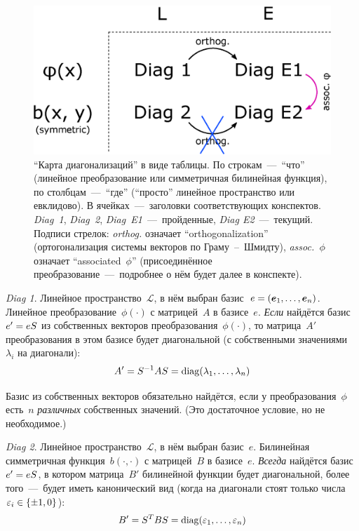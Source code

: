\documentclass[a4paper,12pt]{article}
\theoremstyle{remark}
\begin{document}
  \begin{figure}[h]
    \centering
    
    \includegraphics[width=0.7\columnwidth]{diag-scheme}
    
    \caption{``Карта диагонализаций'' в виде таблицы. По строкам~---~``что'' (линейное преобразование или симметричная билинейная функция), по столбцам~---~``где'' (``просто'' линейное пространство или евклидово). В ячейках~---~заголовки соответствующих конспектов. \emph{Diag~1}, \emph{Diag~2}, \emph{Diag~E1}~---~пройденные, \emph{Diag E2}~---~текущий. Подписи стрелок: \emph{orthog.} означает ``orthogonalization'' (ортогонализация системы векторов по Граму~--~Шмидту), \emph{assoc.~$\phi$} означает ``associated~$\phi$'' (присоединённое преобразование~---~подробнее о нём будет далее в конспекте).}
    \label{fig:diag-scheme}
  \end{figure}
  
  \emph{Diag 1}.
  Линейное пространство~$\mathcal L$, в нём выбран базис~$e \hm= (\bds e_1, \ldots, \bds e_n)$.
  Линейное преобразование~$\phi(\cdot)$ с матрицей~$A$ в базисе~$e$.
  \emph{Если} найдётся базис~$e' \hm= e S$ из собственных векторов преобразования~$\phi(\cdot)$, то матрица~$A'$ преобразования в этом базисе будет диагональной (с собственными значениями~$\lambda_i$ на диагонали):
  \begin{equation}\label{eq:diag1-matrix-change}
    A' = S^{-1} A S = \operatorname{diag}(\lambda_1, \ldots, \lambda_n)
  \end{equation}
  
  Базис из собственных векторов обязательно найдётся, если у преобразования~$\phi$ есть~$n$ \emph{различных} собственных значений.
  (Это достаточное условие, но не необходимое.)
  
  \smallskip
  
  \emph{Diag 2}.
  Линейное пространство~$\mathcal L$, в нём выбран базис~$e$.
  Билинейная симметричная функция~$b(\cdot, \cdot)$ с матрицей~$B$ в базисе~$e$.
  \emph{Всегда} найдётся базис~$e' \hm= e S$, в котором матрица~$B'$ билинейной функции будет диагональной, более того~---~будет иметь канонический вид (когда на диагонали стоят только числа $\eps_i \hm\in \{\pm 1, 0\}$):
  \begin{equation}\label{eq:diag2-matrix-change}
    B' = S^T B S = \operatorname{diag}(\varepsilon_1, \ldots, \varepsilon_n)
  \end{equation}
  
\end{document}
